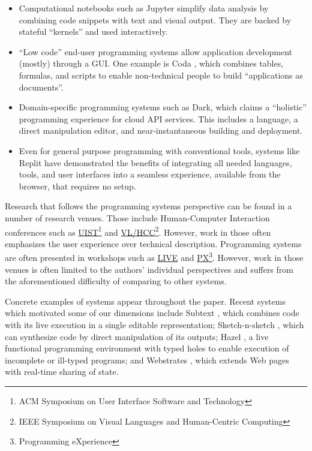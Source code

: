 \begin{itemize}
\tightlist
\item
  Computational notebooks such as Jupyter simplify data analysis by
  combining code snippets with text and visual output. They are backed
  by stateful ``kernels'' and used interactively.
\item
  ``Low code'' end-user programming systems allow application
  development (mostly) through a GUI. One example is Coda
  \cite{CodaWeb}, which combines tables, formulas, and scripts to enable
  non-technical people to build ``applications as documents''.
\item
  Domain-specific programming systems such as Dark, which claims a
  ``holistic'' programming experience for cloud API services. This
  includes a language, a direct manipulation editor, and
  near-instantaneous building and deployment.
\item
  Even for general purpose programming with conventional tools, systems
  like Replit have demonstrated the benefits of integrating all needed
  languages, tools, and user interfaces into a seamless experience,
  available from the browser, that requires no setup.
\end{itemize}

Research that follows the programming systems perspective can be found
in a number of research venues. Those include Human-Computer Interaction
conferences such as \href{https://uist.acm.org/}{UIST}\footnote{ACM
  Symposium on User Interface Software and Technology} and
\href{https://conferences.computer.org/VLHCC/}{VL/HCC}\footnote{IEEE
  Symposium on Visual Languages and Human-Centric Computing}. However,
work in those often emphasizes the user experience over technical
description. Programming systems are often presented in workshops such
as \href{https://liveprog.org/}{LIVE} and
\href{https://2021.programming-conference.org/home/px-2021}{PX}\footnote{Programming
  eXperience}. However, work in those venues is often limited to the
authors' individual perspectives and suffers from the aforementioned
difficulty of comparing to other systems.

Concrete examples of systems appear throughout the paper. Recent systems
which motivated some of our dimensions include Subtext \cite{Subtext},
which combines code with its live execution in a single editable
representation; Sketch-n-sketch \cite{SnS}, which can synthesize code by
direct manipulation of its outputs; Hazel \cite{Hazel}, a live
functional programming environment with typed holes to enable execution
of incomplete or ill-typed programs; and Webstrates \cite{Webstrates},
which extends Web pages with real-time sharing of state.

